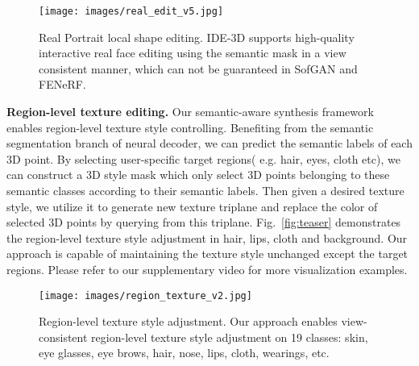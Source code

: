 \documentclass[acmtog]{acmart}
\begin{document}
\begin{figure}
  \centering
  \texttt{[image: images/real\_edit\_v5.jpg]}
  \caption{Real Portrait local shape editing. IDE-3D supports high-quality interactive real face editing using the semantic mask in a view consistent manner, which can not be guaranteed in SofGAN and FENeRF.}
  \Description{}
  \label{fig:real_edit}
\end{figure}

\noindent \textbf{Region-level texture editing.} Our semantic-aware synthesis framework enables region-level texture style controlling. Benefiting from the semantic segmentation branch of neural decoder, we can predict the semantic labels of each 3D point. By selecting user-specific target regions( e.g. hair, eyes, cloth etc), we can construct a 3D style mask which only select 3D points belonging to these semantic classes according to their semantic labels. Then given a desired texture style, we utilize it to generate new texture triplane and replace the color of selected 3D points by querying from this triplane. Fig.~\ref{fig:teaser} demonstrates the region-level texture style adjustment in hair, lips, cloth and background. Our approach is capable of maintaining the texture style unchanged except the target regions. Please refer to our supplementary video for more visualization examples. 
\begin{figure}
 \centering
 \texttt{[image: images/region\_texture\_v2.jpg]}
 \caption{Region-level texture style adjustment. Our approach enables view-consistent region-level texture style adjustment on 19 classes: skin, eye glasses, eye brows, hair, nose, lips, cloth, wearings, etc.}
 \Description{}
 \label{texture editing}
\end{figure}
\end{document}
